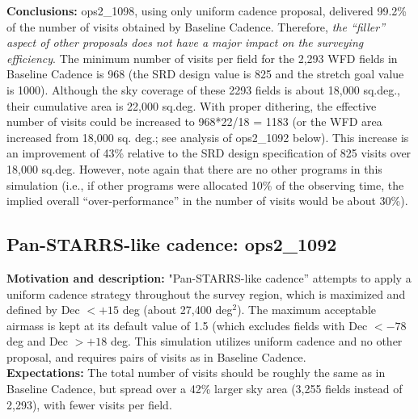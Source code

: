 \documentclass[manuscript]{article}
\begin{document}
{\bf Conclusions:} 
ops2\_1098, using only uniform cadence proposal, delivered 99.2\% of the number
of visits obtained by Baseline Cadence. Therefore, {\it the ``filler'' aspect of other proposals
does not have a major impact on the surveying efficiency}. The minimum number of visits
per field for the 2,293 WFD fields in Baseline Cadence is 968 (the SRD design value is 825
and the stretch goal value is 1000). Although the sky coverage of these 2293 fields is about
18,000 sq.deg., their cumulative area is 22,000 sq.deg. With proper dithering, the effective
number of visits could be increased to 968*22/18 = 1183 (or the WFD area increased from
18,000 sq. deg.; see analysis of ops2\_1092 below). This increase is an improvement of 
43\% relative to the SRD design specification of 825 visits over 18,000 sq.deg. However, 
note again that there are no other programs in this simulation (i.e., if other programs were 
allocated 10\% of the observing time, the implied overall ``over-performance'' in the 
number of  visits would be about 30\%). 



\subsection{Pan-STARRS-like cadence: ops2\_1092} 

{\bf Motivation and description:} "Pan-STARRS-like cadence” attempts to apply a 
uniform cadence strategy throughout the survey region, which is maximized and defined 
by Dec $< +15$ deg (about 27,400 deg$^2$). The maximum acceptable airmass is kept 
at its default value of 1.5 (which excludes fields with Dec $< -78$ deg and Dec $> +18$ 
deg. This simulation utilizes uniform cadence and no other proposal, and requires pairs of 
visits as in Baseline Cadence. \\

{\bf Expectations:} The total number of visits should be roughly the same as in 
Baseline Cadence, but spread over a 42\% larger sky area (3,255 fields instead of 
2,293), with fewer visits per field. \\
\end{document}
